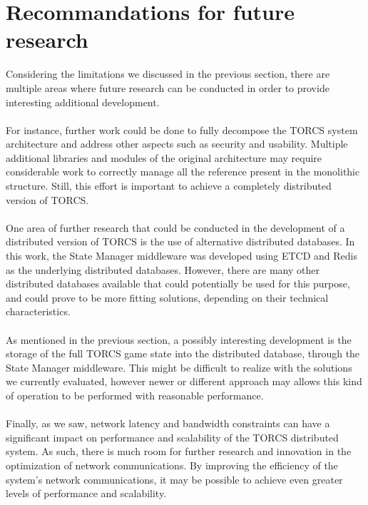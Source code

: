 \section{Recommandations for future research}
Considering the limitations we discussed in the previous section, there are multiple areas where future research can be conducted in order to provide interesting additional development. \\ \\
For instance, further work could be done to fully decompose the TORCS system architecture and address other aspects such as security and usability. Multiple additional libraries and modules of the original architecture may require considerable work to correctly manage all the reference present in the monolithic structure. Still, this effort is important to achieve a completely distributed version of TORCS. \\ \\
One area of further research that could be conducted in the development of a distributed version of TORCS is the use of alternative distributed databases. In this work, the State Manager middleware was developed using ETCD and Redis as the underlying distributed databases. However, there are many other distributed databases available that could potentially be used for this purpose, and could prove to be more fitting solutions, depending on their technical characteristics. \\ \\
As mentioned in the previous section, a possibly interesting development is the storage of the full TORCS game state into the distributed database, through the State Manager middleware. This might be difficult to realize with the solutions we currently evaluated, however newer or different approach may allows this kind of operation to be performed with reasonable performance. \\ \\
Finally, as we saw, network latency and bandwidth constraints can have a significant impact on performance and scalability of the TORCS distributed system. As such, there is much room for further research and innovation in the optimization of network communications. By improving the efficiency of the system's network communications, it may be possible to achieve even greater levels of performance and scalability.